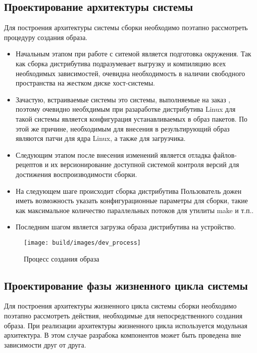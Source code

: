 \subsection{Проектирование архитектуры системы}
Для построения архитектуры системы сборки необходимо поэтапно рассмотреть процедуру создания образа.
\begin{itemize}
  \item Начальным этапом при работе с ситемой является подготовка окружения.
        Так как сборка дистрибутива подразумевает выгрузку и компиляцию всех необходимых зависимостей, очевидна необходимость в наличии свободного пространства на жестком диске хост-системы.
  \item Зачастую, встраиваемые системы это системы, выполняемые на заказ \cite{EMBEDDED}, поэтому очевидно необхдимым при разаработке дистрибутива Linux для такой системы является конфигурация устанавливаемых в образ пакетов.
        По этой же причине, необходимым для внесения в результирующий образ являются патчи для ядра Linux, а также для загрузчика.
  \item Следующим этапом после внесения изменений является отладка файлов-рецептов и их версионирование доступной системой контроля версий для достижения воспроизводимости сборки.
  \item На следующем шаге происходит сборка дистрибутива
        Пользователь дожен иметь возможность указать конфигурационные параметры для сборки, такие как максимальное количество параллельных потоков для утилиты make и т.п..
  \item Последним шагом является загрузка образа дистрибутива на устройство.
\end{itemize}

\begin{figure}[h!]
  \centering
  \setlength{\fboxsep}{5pt}
  \texttt{[image: build/images/dev\_process]}
  \caption{Процесс создания образа}\label{fig: dev_process}
\end{figure}

\newpage
\subsection{Проектирование фазы жизненного цикла системы}
Для построения архитектуры жизненного цикла системы сборки необходимо поэтапно рассмотреть действия, необходимые для непосредственного создания образа.
При реализации архитектуры жизненного цикла используется модульная архитектура.
В этом случае разрабока компонентов может быть проведена вне зависимости друг от друга.

